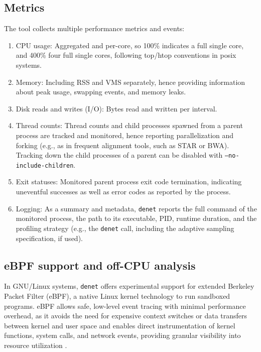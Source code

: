 \documentclass[10pt]{article}
\begin{document}
\subsection*{Metrics}

The tool collects multiple performance metrics and events:

\begin{enumerate}[itemsep=0.5pt, topsep=1pt]
    \item CPU usage: Aggregated and per-core, so 100\% indicates a full single core, and 400\% four full single cores, following top/htop conventions in posix systems.
    \item Memory: Including RSS and VMS separately, hence providing information about peak usage, swapping events, and memory leaks.
    \item Disk reads and writes (I/O): Bytes read and written per interval.
    \item Thread counts: Thread counts and child processes spawned from a parent process are tracked and monitored, hence reporting parallelization and forking (e.g., as in frequent alignment tools, such as STAR or BWA). Tracking down the child processes of a parent can be disabled with \texttt{--no-include-children}. 
    \item Exit statuses: Monitored parent process exit code termination, indicating uneventful successes as well as error codes as reported by the process.
    \item Logging: As a summary and metadata, \texttt{denet} reports the full command of the monitored process, the path to its executable, PID, runtime duration, and the profiling strategy (e.g., the \texttt{denet} call, including the adaptive sampling specification, if used).
\end{enumerate}

\subsection*{eBPF support and off-CPU analysis}

In GNU/Linux systems, \texttt{denet} offers experimental support for extended Berkeley Packet Filter (eBPF), a native Linux kernel technology to run sandboxed programs. eBPF allows safe, low-level event tracing with minimal performance overhead, as it avoids the need for expensive context switches or data transfers between kernel and user space and enables direct instrumentation of kernel functions, system calls, and network events, providing granular visibility into resource utilization \cite{gregg2019bpf,gbadamosi2024ebpf}. 
\end{document}
